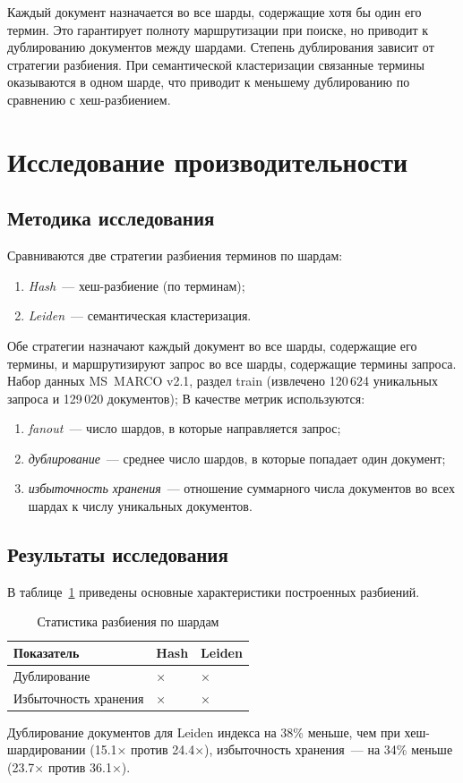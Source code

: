 \documentclass[14pt, a4paper]{article}
\begin{document}
	Каждый документ назначается во все шарды, содержащие хотя бы один его термин.
	Это гарантирует полноту маршрутизации при поиске, но приводит к дублированию документов между шардами.
	Степень дублирования зависит от стратегии разбиения.
	При семантической кластеризации связанные термины оказываются в одном шарде, что приводит к меньшему дублированию по сравнению с хеш-разбиением.

	\section{Исследование производительности}

	\subsection{Методика исследования}

	Сравниваются две стратегии разбиения терминов по шардам:
	\begin{enumerate}
		\item \textit{Hash}~--- хеш-разбиение (по терминам);
		\item \textit{Leiden}~--- семантическая кластеризация.
	\end{enumerate}
	Обе стратегии назначают каждый документ во все шарды, содержащие его термины, и маршрутизируют запрос во все шарды, содержащие термины запроса.
	Набор данных MS~MARCO v2.1, раздел train (извлечено 120\,624 уникальных запроса и 129\,020 документов);
	В качестве метрик используются:
	\begin{enumerate}
		\item \textit{fanout}~--- число шардов, в которые направляется запрос;
		\item \textit{дублирование}~--- среднее число шардов, в которые попадает один документ;
		\item \textit{избыточность хранения}~--- отношение суммарного числа документов во всех шардах к числу уникальных документов.
	\end{enumerate}

	\subsection{Результаты исследования}

	В таблице~\ref{tab:partition-stats} приведены основные характеристики построенных разбиений.
	\begin{table}[H]
	\centering
	\caption{Статистика разбиения по шардам}
	\label{tab:partition-stats}
	\begin{tabularx}{\textwidth}{|>{\raggedright\arraybackslash}X|>{\raggedright\arraybackslash}X|>{\raggedright\arraybackslash}X|}
	\hline
	\textbf{Показатель} & \textbf{Hash} & \textbf{Leiden} \\
	\hline
	Дублирование & 24.4× & 15.1× \\
	\hline
	Избыточность хранения & 36.1× & 23.7× \\
	\hline
	\end{tabularx}
	\end{table}
	Дублирование документов для Leiden индекса на 38\% меньше, чем при хеш-шардировании (15.1× против 24.4×), избыточность хранения~--- на 34\% меньше (23.7× против 36.1×).
\end{document}
